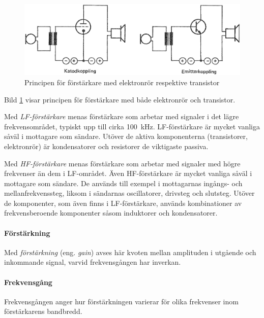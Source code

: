 \begin{figure}
\includegraphics[width=\textwidth]{images/cropped_pdfs/bild_2_3-41.pdf}
\caption{Principen för förstärkare med elektronrör respektive transistor}
\label{fig:BildII3-41}
\end{figure}

Bild \ref{fig:BildII3-41} visar principen för förstärkare med både elektronrör
och transistor.

Med \emph{LF-förstärkare} menas förstärkare som arbetar med signaler i
det lägre frekvensområdet, typiskt upp till cirka 100~kHz.
LF-förstärkare är mycket vanliga såväl i mottagare som sändare.
Utöver de aktiva komponenterna (transistorer, elektronrör) är kondensatorer
och resistorer de viktigaste passiva.

Med \emph{HF-förstärkare} menas förstärkare som arbetar med signaler
med högre frekvenser än dem i LF-området.
Även HF-förstärkare är mycket vanliga såväl i mottagare som sändare.
De används till exempel i mottagarnas ingångs- och mellanfrekvenssteg, liksom i
sändarnas oscillatorer, drivsteg och slutsteg.
Utöver de komponenter, som även finns i LF-förstärkare, används kombinationer
av frekvensberoende komponenter såsom induktorer och kondensatorer.

\paragraph{Förstärkning}

Med \emph{förstärkning} (eng. \emph{gain}) avses här kvoten mellan amplituden i
utgående och inkommande signal, varvid frekvensgången har inverkan.

\paragraph{Frekvensgång}
Frekvensgången anger hur förstärkningen varierar för olika frekvenser inom förstärkarens bandbredd.

